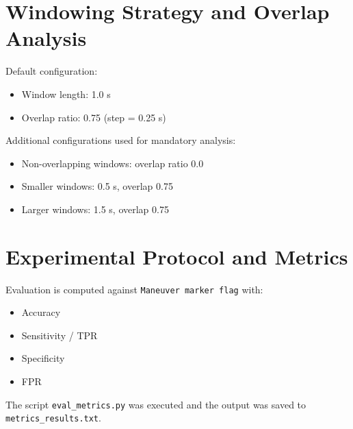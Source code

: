 \documentclass[11pt,a4paper]{article}
\begin{document}
\section{Windowing Strategy and Overlap Analysis}
Default configuration:
\begin{itemize}
    \item Window length: 1.0 s
    \item Overlap ratio: 0.75 (step = 0.25 s)
\end{itemize}

Additional configurations used for mandatory analysis:
\begin{itemize}
    \item Non-overlapping windows: overlap ratio 0.0
    \item Smaller windows: 0.5 s, overlap 0.75
    \item Larger windows: 1.5 s, overlap 0.75
\end{itemize}

\section{Experimental Protocol and Metrics}
Evaluation is computed against \texttt{Maneuver marker flag} with:
\begin{itemize}
    \item Accuracy
    \item Sensitivity / TPR
    \item Specificity
    \item FPR
\end{itemize}

The script \texttt{eval\_metrics.py} was executed and the output was saved to \texttt{metrics\_results.txt}.
\end{document}
